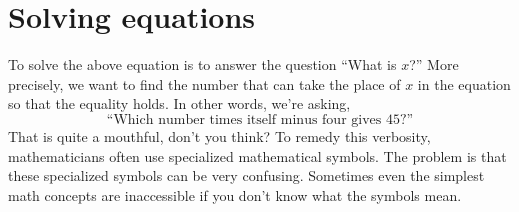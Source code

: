 
\section{Solving equations}
\label{sec:solving_equations}

To solve the above equation is to answer the question ``What is $x$?''
More precisely,
we want to find the number that can take the place of $x$ in the equation so that the equality holds.
In other words, we're asking,
\[
  \text{``Which number times itself minus four gives 45?''}
\]
That is quite a mouthful, don't you think?
To remedy this verbosity, mathematicians often use specialized mathematical symbols.
The problem is that these specialized symbols can be very confusing.
Sometimes even the simplest math concepts are inaccessible if you don't know what the symbols mean.
